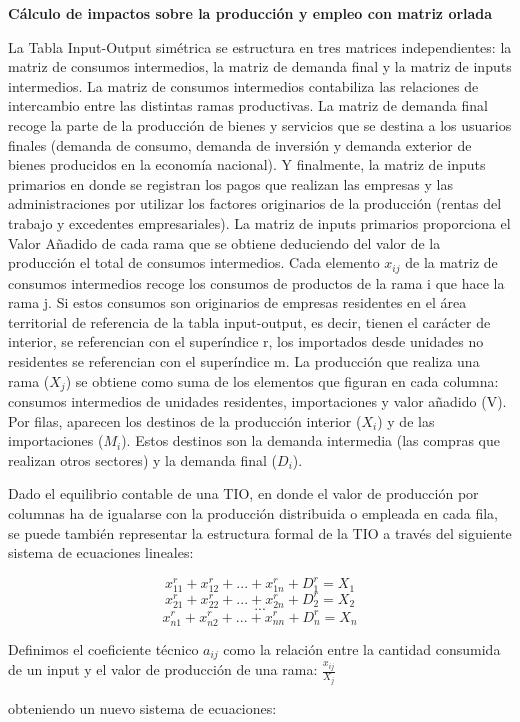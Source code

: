 \documentclass{article}
\begin{document}
{\bf Cálculo de impactos sobre la producción y empleo con matriz orlada}

La Tabla Input-Output  simétrica se estructura en tres matrices independientes: la matriz de consumos intermedios, la matriz de demanda final y la matriz de inputs intermedios. La matriz de consumos intermedios contabiliza las relaciones de intercambio entre las distintas ramas productivas. La matriz de demanda final recoge la parte de la producción de bienes y servicios que se destina a los usuarios finales (demanda de consumo, demanda de inversión y demanda exterior de bienes producidos en la economía nacional). Y finalmente, la matriz de inputs primarios en donde se registran los pagos que realizan las empresas y las administraciones por utilizar los factores originarios de la producción (rentas del trabajo y excedentes empresariales). La matriz de inputs primarios proporciona el Valor Añadido de cada rama que se obtiene deduciendo del valor de la producción el total de consumos intermedios.  Cada elemento $x_{ij}$ de la matriz de consumos intermedios recoge los consumos de productos de la rama i que hace la rama j. Si estos consumos son originarios de empresas residentes en el área territorial de referencia de la tabla input-output, es decir, tienen el carácter de interior, se referencian con el superíndice r, los importados desde unidades no residentes se referencian con el superíndice m. La producción que realiza una rama  ($X_j$) se obtiene como suma de los elementos que figuran en cada columna: consumos intermedios de unidades residentes, importaciones y valor añadido (V). Por filas, aparecen los destinos de la producción interior ($X_i$) y de las importaciones ($M_i$). Estos destinos son la demanda intermedia (las compras que realizan otros sectores) y la demanda final ($D_i$).

Dado el equilibrio contable de una TIO, en donde el valor de producción por columnas ha de igualarse con la producción distribuida o empleada en cada fila, se puede también representar la estructura formal de la TIO a través del siguiente sistema de ecuaciones lineales:

$$x^r_{11}+x^r_{12}+...+x^r_{1n}+D^r_1=X_1$$
$$x^r_{21}+x^r_{22}+...+x^r_{2n}+D^r_2=X_2$$
$$...$$
$$x^r_{n1}+x^r_{n2}+...+x^r_{nn}+D^r_n=X_n$$

Definimos el coeficiente técnico $a_{ij}$  como la relación entre la cantidad consumida de un input y el valor de producción de una rama:  $\frac{x_{ij}}{X_j}$

obteniendo un nuevo sistema de ecuaciones:
\end{document}
